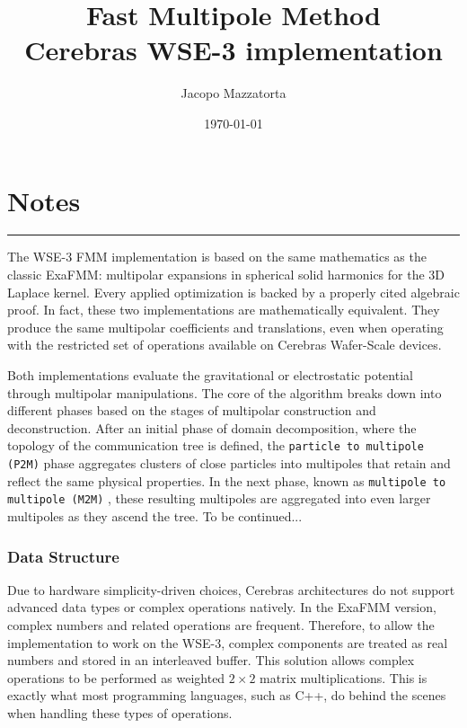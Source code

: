 \documentclass[10pt,dvipsnames,table]{article}
\title{Fast Multipole Method\\[0.2em]
{\large\color{MidInk} Cerebras WSE-3 implementation}}
\author{Jacopo Mazzatorta}
\date{\today}
\newcommand{\sectionrule}{\vspace{0.2em}\noindent\textcolor{PaleInk}{\rule{\columnwidth}{0.4pt}}\vspace{0.3em}}
\let\oldsection\section
\renewcommand{\section}[1]{\oldsection{#1}\sectionrule}
\let\oldtexttt\texttt
\renewcommand{\texttt}[1]{%
  {\small\colorbox{Mist}{\oldtexttt{\textcolor{DarkInk}{#1}}}}%
}
\begin{document}
\maketitle
\thispagestyle{plain}

\section{Notes}

The WSE-3 FMM implementation is based on the same mathematics as the classic ExaFMM: multipolar expansions in spherical solid harmonics for the 3D Laplace kernel. Every applied optimization is backed by a properly cited algebraic proof. 
In fact, these two implementations are mathematically equivalent. They produce the same multipolar coefficients and translations, even when operating with the restricted set of operations available on Cerebras Wafer-Scale devices.

Both implementations evaluate the gravitational or electrostatic potential through multipolar manipulations. The core of the algorithm breaks down into different phases based on the stages of multipolar construction and deconstruction. 
After an initial phase of domain decomposition, where the topology of the communication tree is defined, the \texttt{particle to multipole (P2M)} phase aggregates clusters of close particles into multipoles that retain and reflect the same physical properties. 
In the next phase, known as \texttt{multipole to multipole (M2M)}, these resulting multipoles are aggregated into even larger multipoles as they ascend the tree.
To be continued...

\subsubsection{Data Structure}
Due to hardware simplicity-driven choices, Cerebras architectures do not support advanced data types or complex operations natively. 
In the ExaFMM version, complex numbers and related operations are frequent. 
Therefore, to allow the implementation to work on the WSE-3, complex components are treated as real numbers and stored in an interleaved buffer. 
This solution allows complex operations to be performed as weighted $2 \times 2$ matrix multiplications. This is exactly what most programming languages, such as C++, do behind the scenes when handling these types of operations.
\end{document}
